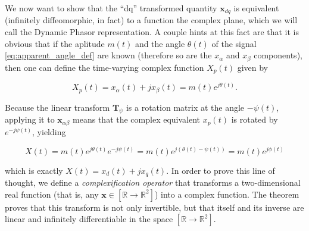 	We now want to show that the ``dq'' transformed quantity $\mathbf{x}_{dq}$ is equivalent (infinitely diffeomorphic, in fact) to a function the complex plane, which we will call the Dynamic Phasor representation. A couple hints at this fact are that it is obvious that if the aplitude $m(t)$ and the angle $\theta(t)$ of the signal \eqref{eq:apparent_angle_def} are known (therefore so are the $x_\alpha$ and $x_\beta$ components), then one can define the time-varying complex function $X_p(t)$ given by

\begin{equation} X_p(t) = x_\alpha(t) + jx_\beta(t) = m(t)e^{j\theta(t)} . \label{eq:xab_xp}\end{equation}

	Because the linear transform $\mathbf{T}_\psi$ is a rotation matrix at the angle $-\psi(t)$, applying it to  $\mathbf{x}_{\alpha\beta}$ means that the complex equivalent $x_p(t)$ is rotated by $e^{-j\psi(t)}$, yielding

\begin{equation} X(t) = m(t)e^{j\theta(t)} e^{-j\psi(t)}= m(t)e^{j\left(\theta(t) - \psi(t)\right)} = m(t)e^{j\phi(t)} \label{eq:xcomp_xdq}\end{equation}

	\noindent which is exactly $X(t) = x_d(t) + jx_q(t)$. In order to prove this line of thought, we define a \textit{complexification operator} that transforms a two-dimensional real function (that is, any $\mathbf{x}\in\left[\mathbb{R}\to\mathbb{R}^2\right]$) into a complex function. The theorem proves that this transform is not only invertible, but that itself and its inverse are linear and infinitely differentiable in the space $\left[\mathbb{R}\to\mathbb{R}^2\right]$.

